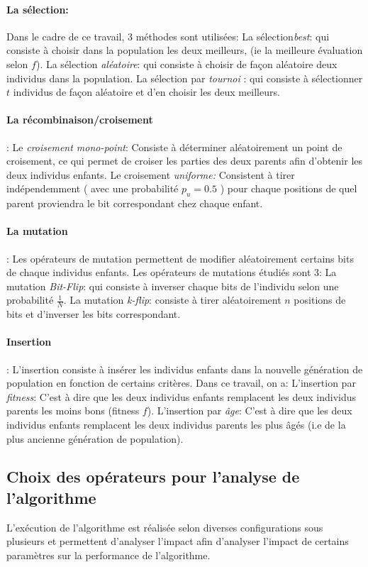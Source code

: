 \documentclass[twocolumn]{article}
\begin{document}
\paragraph{La sélection:}
Dans le cadre de ce travail, 3 méthodes sont utilisées: 
La sélection\emph{best}: qui consiste à choisir dans la population les deux meilleurs, (ie la meilleure évaluation selon $f$).
La sélection\emph{ aléatoire}: qui consiste à choisir de façon aléatoire deux individus dans la population.
La sélection par \emph{tournoi} : qui consiste à sélectionner $t$ individus de façon aléatoire et d'en choisir les deux meilleurs.

\paragraph{La récombinaison/croisement}:
Le \emph{croisement mono-point}: Consiste à déterminer aléatoirement un point de croisement, ce qui permet de croiser les parties des deux parents afin d'obtenir les deux individus enfants.
Le croisement \emph{uniforme:} Consistent à tirer indépendemment ( avec  une probabilité $p_u = 0.5$ ) pour chaque positions de quel parent proviendra le bit correspondant chez chaque enfant.

\paragraph{La mutation}: Les opérateurs de mutation permettent de modifier aléatoirement certains bits de chaque individus enfants. Les opérateurs de mutations étudiés sont 3:
La mutation \emph{Bit-Flip}: qui consiste à inverser chaque bits de l'individu selon une probabilité $\frac{1}{N}$.
La mutation \emph{k-flip}: consiste à tirer aléatoirement $n$ positions de bits et d'inverser les bits correspondant.

\paragraph{Insertion}:
L'insertion consiste à insérer les individus enfants dans la nouvelle génération de population en fonction de certains critères. Dans ce travail, on a:
L'insertion par \emph{fitness}: C'est à dire que les deux individus enfants remplacent les deux individus parents les moins bons (fitness $f$).
L'insertion par \emph{âge}: C'est à dire que les deux individus enfants remplacent les deux individus parents les plus âgés (i.e de la plus ancienne génération de population).

\subsection{Choix des opérateurs pour l'analyse de l'algorithme}
L'exécution de l'algorithme est réalisée selon diverses configurations sous plusieurs et permettent d'analyser l'impact afin d'analyser l'impact de certains paramètres sur la performance de l'algorithme.
\end{document}
